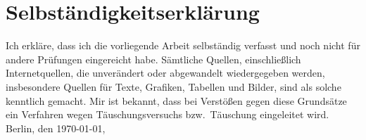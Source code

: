 \documentclass[draft=false,twoside,12pt]{scrreprt}
\begin{document}
\printbibliography

\chapter*{Selbständigkeitserklärung}
Ich erkläre, dass ich die vorliegende Arbeit selbständig verfasst und noch nicht 
für andere Prüfungen eingereicht habe. Sämtliche Quellen, einschließlich
Internetquellen, die unverändert oder abgewandelt wiedergegeben werden,
insbesondere Quellen für Texte, Grafiken, Tabellen und Bilder, sind als solche
kenntlich gemacht. Mir ist bekannt, dass bei Verstößen gegen diese Grundsätze ein
Verfahren wegen Täuschungsversuchs bzw.\ Täuschung eingeleitet wird. 
\bigbreak
\noindent Berlin, den \today, 
\end{document}
